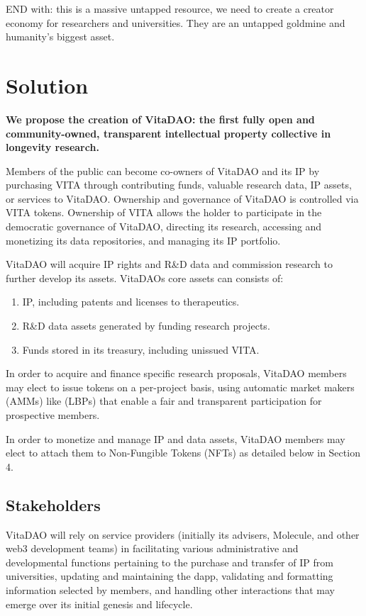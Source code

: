 \documentclass[12pt,letterpaper]{article}
\begin{document}
END with: this is a massive untapped resource, we need to create a creator economy for researchers and universities. They are an untapped goldmine and humanity’s biggest asset.

\section{Solution}
\textbf{We propose the creation of VitaDAO: the first fully open and community-owned, transparent intellectual property collective in longevity research.}

Members of the public can become co-owners of VitaDAO and its IP by purchasing VITA through contributing funds, valuable research data, IP assets, or services to VitaDAO. Ownership and governance of VitaDAO is controlled via VITA tokens. Ownership of VITA allows the holder to participate in the democratic governance of VitaDAO, directing its research, accessing and monetizing its data repositories, and managing its IP portfolio.

VitaDAO will acquire IP rights and R\&D data and commission research to further develop its assets. VitaDAOs core assets can consists of:
\begin{enumerate}
\item IP, including patents and licenses to therapeutics.
\item R\&D data assets generated by funding research projects.
\item Funds stored in its treasury, including unissued VITA.
\end{enumerate}

In order to acquire and finance specific research proposals, VitaDAO members may elect to issue tokens on a per-project basis, using automatic market makers (AMMs) like  (LBPs) that enable a fair and transparent participation for prospective members. 

In order to monetize and manage IP and data assets, VitaDAO members may elect to attach them to Non-Fungible Tokens (NFTs) as detailed below in Section 4.

\subsection{Stakeholders}
VitaDAO will rely on service providers (initially its advisers, Molecule, and other web3 development teams) in facilitating various administrative and developmental functions pertaining to the purchase and transfer of IP from universities, updating and maintaining the dapp, validating and formatting information selected by members, and handling other interactions that may emerge over its initial genesis and lifecycle.
\end{document}
